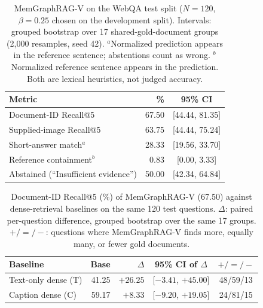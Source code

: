 
\begin{table}[t]
  \centering
  \footnotesize
  \setlength{\tabcolsep}{5pt}
  \begin{tabular}{lrc}
    \toprule
    Metric & \% & 95\% CI \\
    \midrule
    Document-ID Recall@5             & 67.50 & [44.44, 81.35] \\
    Supplied-image Recall@5          & 63.75 & [44.44, 75.24] \\
    \midrule
    Short-answer match$^{a}$         & 28.33 & [19.56, 33.70] \\
    Reference containment$^{b}$      &  0.83 & [0.00, 3.33] \\
    Abstained (``Insufficient evidence'') & 50.00 & [42.34, 64.84] \\
    \bottomrule
  \end{tabular}
  \caption{MemGraphRAG-V on the WebQA test split ($N=120$, $\beta=0.25$ chosen on the
  development split). Intervals: grouped bootstrap over 17 shared-gold-document groups
  (2{,}000 resamples, seed 42).
  $^{a}$Normalized prediction appears in the reference sentence; abstentions count as wrong.
  $^{b}$Normalized reference sentence appears in the prediction. Both are lexical heuristics,
  not judged accuracy.}
  \label{tab:webqa-test}
\end{table}

\begin{table}[t]
  \centering
  \footnotesize
  \setlength{\tabcolsep}{4pt}
  \begin{tabular}{lrrcc}
    \toprule
    Baseline & Base & $\Delta$ & 95\% CI of $\Delta$ & $+/{=}/-$ \\
    \midrule
    Text-only dense (T)  & 41.25 & $+26.25$ & [$-3.41$, $+45.00$] & 48/59/13 \\
    Caption dense (C)    & 59.17 &  $+8.33$ & [$-9.20$, $+19.05$] & 24/81/15 \\
    \bottomrule
  \end{tabular}
  \caption{Document-ID Recall@5 (\%) of MemGraphRAG-V (67.50) against dense-retrieval baselines
  on the same 120 test questions. $\Delta$: paired per-question difference, grouped bootstrap over
  the same 17 groups. $+/{=}/-$: questions where MemGraphRAG-V finds more, equally many, or fewer
  gold documents.}
  \label{tab:webqa-paired}
\end{table}

